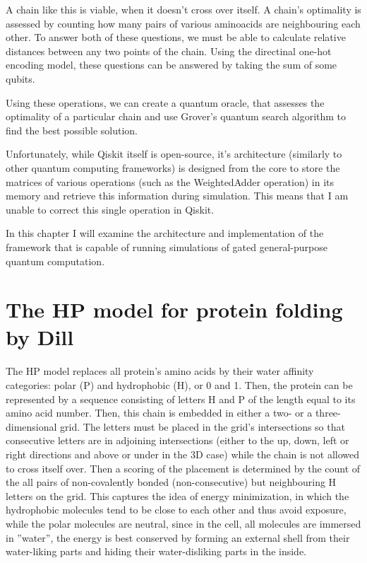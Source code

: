 A chain like this is viable, when it doesn't cross over itself. A chain's optimality is assessed by counting how many pairs of various aminoacids are neighbouring each other. To answer both of these questions, we must be able to calculate relative distances between any two points of the chain. Using the directinal one-hot encoding model, these questions can be answered by taking the sum of some qubits.

Using these operations, we can create a quantum oracle, that assesses the optimality of a particular chain and use Grover's quantum search algorithm to find the best possible solution.

Unfortunately, while Qiskit itself is open-source, it's architecture (similarly to other quantum computing frameworks) is designed from the core to store the matrices of various operations (such as the WeightedAdder operation) in its memory and retrieve this information during simulation. This means that I am unable to correct this single operation in Qiskit.

In this chapter I will examine the architecture and implementation of the framework that is capable of running simulations of gated general-purpose quantum computation.

\section{The HP model for protein folding by Dill}

The HP model\cite{dill_principles_2008} replaces all protein's amino acids by their water affinity categories: polar (P) and hydrophobic (H), or 0 and 1. Then, the protein can be represented by a sequence consisting of letters H and P of the length equal to its amino acid number. Then, this chain is embedded in either a two- or a three-dimensional grid. The letters must be placed in the grid's intersections so that consecutive letters are in adjoining intersections (either to the up, down, left or right directions and above or under in the 3D case) while the chain is not allowed to cross itself over. Then a scoring of the placement is determined by the count of the all pairs of non-covalently bonded (non-consecutive) but neighbouring H letters on the grid. This captures the idea of energy minimization, in which the hydrophobic molecules tend to be close to each other and thus avoid exposure, while the polar molecules are neutral, since in the cell, all molecules are immersed in ''water'', the energy is best conserved by forming an external shell from their water-liking parts and hiding their water-disliking parts in the inside.

